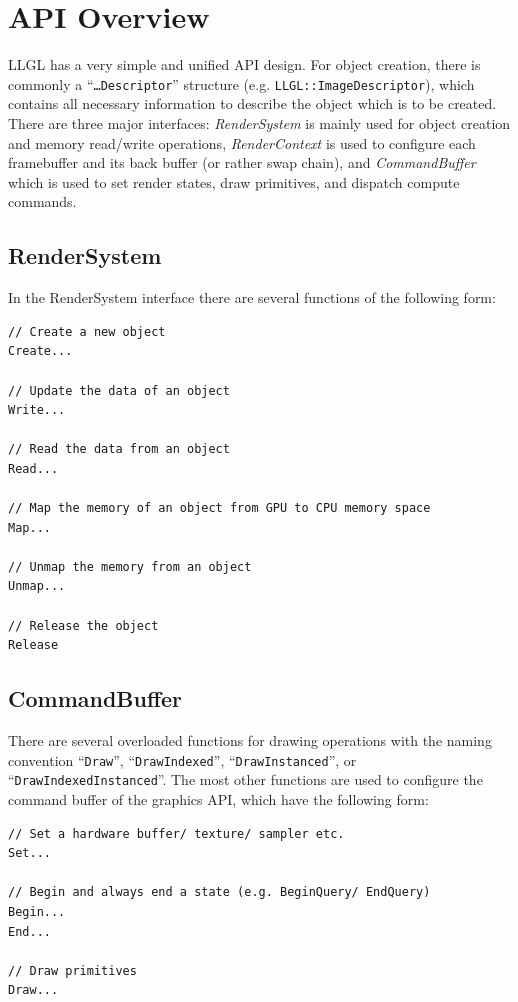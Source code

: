 \documentclass{article}
\begin{document}
\newpage

\section*{API Overview}

LLGL has a very simple and unified API design.
For object creation, there is commonly a ``\texttt{\dots Descriptor}'' structure (e.g. \texttt{LLGL::ImageDescriptor}),
which contains all necessary information to describe the object which is to be created.
There are three major interfaces: \emph{RenderSystem} is mainly used for object creation and memory read/write operations,
\emph{RenderContext} is used to configure each framebuffer and its back buffer (or rather swap chain),
and \emph{CommandBuffer} which is used to set render states, draw primitives, and dispatch compute commands.

\subsection*{RenderSystem}

In the RenderSystem interface there are several functions of the following form:
\begin{lstlisting}
// Create a new object
Create...

// Update the data of an object
Write...

// Read the data from an object
Read...

// Map the memory of an object from GPU to CPU memory space
Map...

// Unmap the memory from an object
Unmap...

// Release the object
Release
\end{lstlisting}

\subsection*{CommandBuffer}

There are several overloaded functions for drawing operations with the naming convention
``\texttt{Draw}'', ``\texttt{DrawIndexed}'', ``\texttt{DrawInstanced}'', or ``\texttt{DrawIndexedInstanced}''.
The most other functions are used to configure the command buffer of the graphics API, which have the following form:
\begin{lstlisting}
// Set a hardware buffer/ texture/ sampler etc.
Set...

// Begin and always end a state (e.g. BeginQuery/ EndQuery)
Begin...
End...

// Draw primitives
Draw...
\end{lstlisting}
\end{document}
